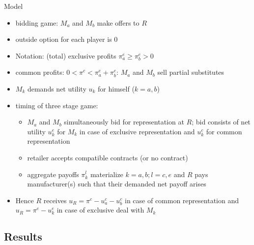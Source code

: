 \documentclass[11pt,english]{beamer}
\begin{document}
\begin{frame}[allowframebreaks]{Model}
  \begin{itemize}
  \item bidding game: $M_a$ and $M_b$ make offers to $R$
  \item outside option for each player is 0
  \item Notation: (total) exclusive profits $\pi^e_a \geq \pi^e_b >0$
  \item common profits: $0 < \pi^c < \pi^e_a +\pi_b^e$: $M_a$ and $M_b$
    sell partial substitutes
  \item $M_k$ demands net utility $u_k$ for himself ($k=a,b$)
  \item timing of three stage game:
    \begin{itemize}
    \item $M_a$ and $M_b$ simultaneously bid for representation at
      $R$; bid consists of net utility $u_k^e$ for $M_k$ in case of
      exclusive representation and $u_k^c$ for common representation
    \item retailer accepts compatible contracts (or no contract)
    \item aggregate payoffs $\pi_k^l$ materialize $k=a,b;l=c,e$ and
      $R$ pays manufacturer(s) such that their demanded net payoff arises
    \end{itemize}
  \item Hence $R$ receives $u_R = \pi^c-u_a^c-u_b^c$ in case of common
    representation and $u_R = \pi^e-u_k^e$ in case of exclusive deal
    with $M_k$
  \end{itemize}
\end{frame}

\subsection{Results}
\end{document}
